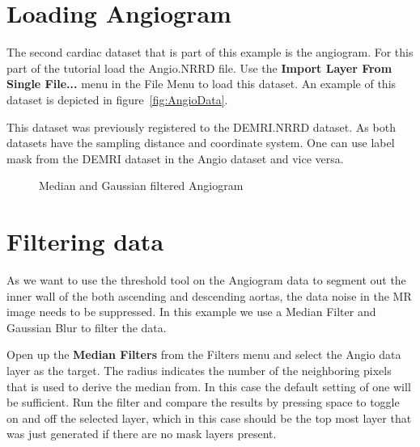 \documentclass[fleqn,11pt,openany]{book}
\begin{document}
\section{Loading  Angiogram}

The second cardiac dataset that is part of this example is the angiogram. For this part of the tutorial load the Angio.NRRD file. Use the {\bf Import Layer From Single File...} menu in the File Menu to load this dataset. An example of this dataset is depicted in figure~\ref{fig:AngioData}.

This dataset was previously registered to the DEMRI.NRRD dataset. As both datasets have the sampling distance and coordinate system. One can use label mask from the DEMRI dataset in the Angio dataset and vice versa. 

\begin{figure}
\caption{Median and Gaussian filtered Angiogram}\label{fig:FilteredAngioData}
\end{figure}

\section{Filtering data}

As we want to use the threshold tool on the Angiogram data to segment out the inner wall of the both ascending and descending aortas, the data noise in the MR image needs to be suppressed. In this example we use a Median Filter and Gaussian Blur to filter the data.

Open up the {\bf Median Filters} from the Filters menu and select the Angio data layer as the target. The radius indicates the number of the neighboring pixels that is used to derive the median from. In this case the default setting of one will be sufficient. Run the filter and compare the results by pressing space to toggle on and off the selected layer, which in this case should be the top most layer that was just generated if there are no mask layers present.
\end{document}
